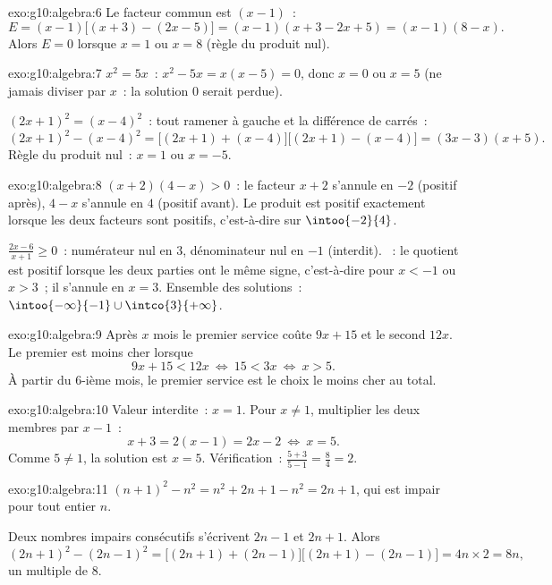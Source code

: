 \begin{solution}{exo:g10:algebra:6}
Le facteur commun est $(x-1)$~:
\[
E = (x-1)\bigl[(x+3) - (2x - 5)\bigr] = (x-1)(x + 3 - 2x + 5)
= (x-1)(8 - x).
\]
Alors $E = 0$ lorsque $x = 1$ ou $x = 8$ (règle du produit nul).
\end{solution}

\begin{solution}{exo:g10:algebra:7}
$x^2 = 5x$~: $x^2 - 5x = x(x - 5) = 0$, donc $x = 0$ ou $x = 5$ (ne
jamais diviser par $x$~: la solution $0$ serait perdue).

$(2x+1)^2 = (x-4)^2$~: tout ramener à gauche et  la
différence de carrés~:
\[
(2x+1)^2 - (x-4)^2
= \bigl[(2x+1) + (x-4)\bigr]\bigl[(2x+1) - (x-4)\bigr]
= (3x - 3)(x + 5).
\]
Règle du produit nul~: $x = 1$ ou $x = -5$.
\end{solution}

\begin{solution}{exo:g10:algebra:8}
$(x+2)(4-x) > 0$~: le facteur $x + 2$ s'annule en $-2$ (positif après),
$4 - x$ s'annule en $4$ (positif avant). Le produit est positif
exactement lorsque les deux facteurs sont positifs, c'est-à-dire sur
$\intoo{-2}{4}$.

$\frac{2x-6}{x+1} \geq 0$~: numérateur nul en $3$, dénominateur nul en
$-1$ (interdit). ~: le quotient est positif lorsque les
deux parties ont le même signe, c'est-à-dire pour $x < -1$ ou $x > 3$~;
il s'annule en $x = 3$. Ensemble des solutions~:
$\intoo{-\infty}{-1} \cup \intco{3}{+\infty}$.
\end{solution}

\begin{solution}{exo:g10:algebra:9}
Après $x$ mois le premier service coûte $9x + 15$ et le second $12x$. Le
premier est moins cher lorsque
\[
9x + 15 < 12x
\ \Longleftrightarrow\
15 < 3x
\ \Longleftrightarrow\
x > 5 .
\]
À partir du $6$-ième mois, le premier service est le choix le moins cher
au total.
\end{solution}

\begin{solution}{exo:g10:algebra:10}
Valeur interdite~: $x = 1$. Pour $x \neq 1$, multiplier les deux
membres par $x - 1$~:
\[
x + 3 = 2(x - 1) = 2x - 2
\ \Longleftrightarrow\
x = 5 .
\]
Comme $5 \neq 1$, la solution est $x = 5$. Vérification~:
$\frac{5+3}{5-1} = \frac84 = 2$.
\end{solution}

\begin{solution}{exo:g10:algebra:11}
$(n+1)^2 - n^2 = n^2 + 2n + 1 - n^2 = 2n + 1$, qui est impair pour tout
entier $n$.

Deux nombres impairs consécutifs s'écrivent $2n - 1$ et $2n + 1$. Alors
\[
(2n+1)^2 - (2n-1)^2
= \bigl[(2n+1)+(2n-1)\bigr]\bigl[(2n+1)-(2n-1)\bigr]
= 4n \times 2 = 8n,
\]
un multiple de $8$.
\end{solution}

